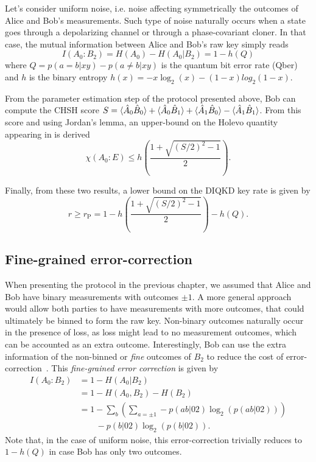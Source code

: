 Let's consider uniform noise, i.e. noise affecting symmetrically the outcomes of Alice and Bob's measurements.
Such type of noise naturally occurs when a state goes through a depolarizing channel or through a phase-covariant cloner.
In that case, the mutual information between Alice and Bob's raw key simply reads
\begin{equation}
	I(A_0 : B_2) = H(A_0) - H(A_0|B_2) = 1 - h(Q)
\end{equation}
where $Q=p(a=b|xy)-p(a\neq b |xy)$ is the quantum bit error rate (Qber) and $h$ is the binary entropy $h(x)=-x \log_2(x) - (1-x)log_2(1-x)$.

From the parameter estimation step of the protocol presented above, Bob can compute the CHSH score $S=\langle {\hat{A}_0 \hat{B}_0} \rangle + \langle {\hat{A}_0 \hat{B}_1} \rangle + \langle {\hat{A}_1 \hat{B}_0} \rangle - \langle {\hat{A}_1 \hat{B}_1} \rangle$.
From this score and using Jordan's lemma, an upper-bound on the Holevo quantity appearing in  is derived
\begin{equation}
	\chi(A_0 : E) \leq h\left(\frac{1+\sqrt{(S/2)^2-1}}{2} \right).
	\label{eq:holevo_pironio}
\end{equation}

Finally, from these two results, a lower bound on the DIQKD key rate is given by
\begin{equation}
	r \geq r_\mathrm{P} = 1 - h\left(\frac{1+\sqrt{(S/2)^2-1}}{2} \right) - h(Q).
	\label{eq:pironio}
\end{equation}

\subsection{Fine-grained error-correction}
\label{sec:Ma_Lutk}

When presenting the protocol in the previous chapter, we assumed that Alice and Bob have binary measurements with outcomes $\pm 1$.
A more general approach would allow both parties to have measurements with more outcomes, that could ultimately be binned to form the raw key.
Non-binary outcomes naturally occur in the presence of loss, as loss might lead to no measurement outcomes, which can be accounted as an extra outcome.
Interestingly, Bob can use the extra information of the non-binned or \textit{fine} outcomes of $B_2$ to reduce the cost of error-correction~\cite{Ma2012}.
This \textit{fine-grained error correction} is given by
\begin{equation}
	\begin{split}
		I(A_0 : B_2) &= 1-H(A_0|B_2) \\
					 &= 1-H(A_0,B_2) - H(B_2) \\
					 &= 1-\sum_b \left( \sum_{a = \pm1} -p(ab|02)\log_2(p(ab|02)) \right) \\
					 &\qquad - p(b|02)\log_2(p(b|02)).
	\end{split}
	\label{eq:Ma}
\end{equation}
Note that, in the case of uniform noise, this error-correction trivially reduces to $1-h(Q)$ in case Bob has only two outcomes.

